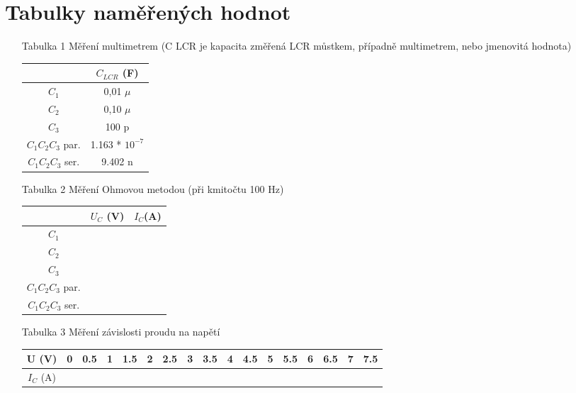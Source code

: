 \documentclass[a4paper,12pt]{report}
\begin{document}
\chapter*{Tabulky naměřených hodnot}
\begin{itemize}
 \item [Tabulka 1]{Měření multimetrem (C LCR je kapacita změřená LCR můstkem, případně multimetrem, nebo jmenovitá hodnota)}
	\begin{center}
		\begin{tabular}{|c|c|}
\hline
                 & $C_{LCR}$ (F)     \\\hline
$C_1$            & 0,01 $\mu$        \\\hline
$C_2$            & 0,10 $\mu$        \\\hline
$C_3$            & 100 p             \\\hline
$C_1C_2C_3$ par. & 1.163 * $10^{-7}$ \\\hline
$C_1C_2C_3$ ser. & 9.402 n           \\\hline
		\end{tabular}
	\end{center}
 \item[Tabulka 2]{Měření Ohmovou metodou (při kmitočtu 100 Hz)}
	\begin{center}
		\begin{tabular}{|c|c|c|}
\hline
                 & $U_C$ (V) & $I_C$(A) \\\hline
$C_1$            &           &          \\\hline
$C_2$            &           &          \\\hline
$C_3$            &           &          \\\hline
$C_1C_2C_3$ par. &           &          \\\hline
$C_1C_2C_3$ ser. &           &          \\\hline
		\end{tabular}
	\end{center}
 \item[Tabulka 3]{Měření závislosti proudu na napětí}
	\begin{center}
		\begin{tabular}{|c|c|c|c|c|c|c|c|c|c|c|c|c|c|c|c|c|}
\hline
U (V)     & 0 & 0.5 & 1 & 1.5 & 2 & 2.5 & 3 & 3.5 & 4 & 4.5 & 5 & 5.5 & 6 & 6.5 & 7 & 7.5 \\\hline
$I_C$ (A) &   &     &   &     &   &     &   &     &   &     &   &     &   &     &   &     \\\hline
		\end{tabular}

\end{center}
\end{itemize}
\end{document}
